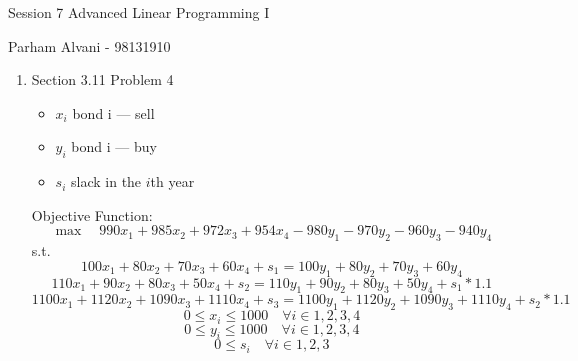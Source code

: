 \documentclass{article}
\begin{document}
\large %


{\Large Session 7 %
\hfill  Advanced Linear Programming I}

\begin{center}
{\Large Parham Alvani - 98131910} %
\end{center}
\vspace{0.05in}


\begin{enumerate}

\item Section 3.11 Problem 4
\begin{itemize}
\item \(x_i\) bond i --- sell
\item \(y_i\) bond i --- buy
\item \(s_i\) slack in the \(i\)th year
\end{itemize}
\par
Objective Function:
\[
    \max\quad990 x_1 + 985 x_2 + 972 x_3 + 954 x_4 - 980 y_1 - 970 y_2 - 960 y_3 - 940 y_4
\]
s.t.
\[
    100 x_1 + 80 x_2 + 70 x_3 + 60 x_4 + s_1 = 100 y_1 + 80 y_2 + 70 y_3 + 60 y_4
\]
\[
    110 x_1 + 90 x_2 + 80 x_3 + 50 x_4 + s_2 = 110 y_1 + 90 y_2 + 80 y_3 + 50 y_4 + s_1 * 1.1
\]
\[
    1100 x_1 + 1120 x_2 + 1090 x_3 + 1110 x_4 + s_3 = 1100 y_1 + 1120 y_2 + 1090 y_3 + 1110 y_4 + s_2 * 1.1
\]
\[
    0 \le x_i \le 1000 \quad \forall i \in {1,2,3,4}
\]
\[
    0 \le y_i \le 1000 \quad \forall i \in {1,2,3,4}
\]
\[
    0 \le s_i \quad \forall i \in {1,2,3}
\]

\end{enumerate}

\end{document}
